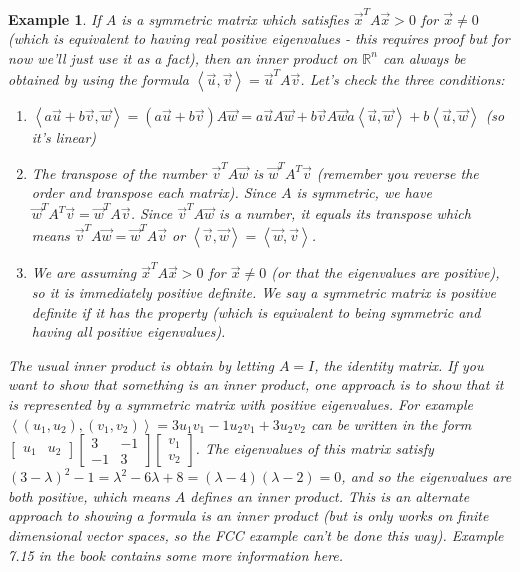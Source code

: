 \documentclass[10pt]{article}
\theoremstyle{plain}
\theoremstyle{box}
\newtheorem{example}{Example}
\newcommand{\R}{{\mathbb{R}}}
\begin{document}
\begin{example}
If $A$ is a symmetric matrix which satisfies $\vec x^T A\vec x> 0$ for $\vec x\neq 0$ (which is equivalent to having real positive eigenvalues - this requires proof but for now we'll just use it as a fact), then an inner product on $\R^n$ can always be obtained by using the formula $\left<\vec u,\vec v\right> = \vec u^T A \vec v$. Let's check the three conditions:
\begin{enumerate}
	\item $\left<a\vec u +b\vec v,\vec w\right> =(a\vec u+b\vec v) A \vec w =a\vec uA\vec w+b\vec vA \vec w   a\left<\vec u,\vec w\right> +b\left<\vec u,\vec w\right> $ (so it's linear)
	\item The transpose of the number $\vec v^T A \vec w$ is $\vec w^T A^T\vec v$ (remember you reverse the order and transpose each matrix).  Since $A$ is symmetric, we have  $\vec w^T A^T\vec v= \vec w^T A\vec v$.  Since $\vec v^T A \vec w$ is a number, it equals its transpose which means $\vec v^T A \vec w= \vec w^T A\vec v$ or $\left<\vec v,\vec w\right> =\left<\vec w,\vec v\right>$.
	\item We are assuming $\vec x^T A\vec x> 0$ for $\vec x\neq 0$ (or that the eigenvalues are positive), so it is immediately positive definite.  We say a symmetric matrix is positive definite if it has the property (which is equivalent to being symmetric and having all positive eigenvalues).
\end{enumerate}
The usual inner product is obtain by letting $A=I$, the identity matrix. If you want to show that something is an inner product, one approach is to show that it is represented by a symmetric matrix with positive eigenvalues. For example $\left<(u_1, u_2),(v_1,v_2)\right> =3u_1v_1-1u_2v_1+3u_2v_2$ can be written in the form 
$
\begin{bmatrix}u_1&u_2\end{bmatrix}
\begin{bmatrix}3&-1\\-1&3\end{bmatrix}
\begin{bmatrix}v_1\\v_2\end{bmatrix}
$. The eigenvalues of this matrix satisfy $(3-\lambda)^2-1 = \lambda^2-6\lambda+8 = (\lambda-4)(\lambda-2) = 0$, and so the eigenvalues are both positive, which means $A$ defines an inner product. This is an alternate approach to showing a formula is an inner product (but is only works on finite dimensional vector spaces, so the FCC example can't be done this way). Example 7.15 in the book contains some more information here.
\end{example}
\end{document}
